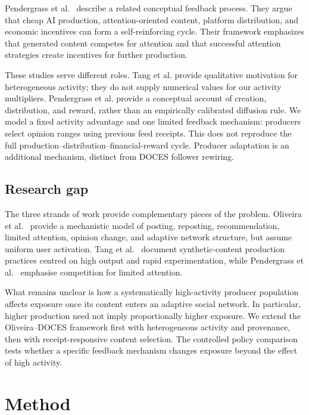 \documentclass[runningheads]{llncs}
\begin{document}
Pendergrass et al.~\cite{pendergrass2025} describe a related conceptual feedback process. They argue that cheap AI production, attention-oriented content, platform distribution, and economic incentives can form a self-reinforcing cycle. Their framework emphasizes that generated content competes for attention and that successful attention strategies create incentives for further production.

These studies serve different roles. Tang et al. provide qualitative motivation for heterogeneous activity; they do not supply numerical values for our activity multipliers. Pendergrass et al. provide a conceptual account of creation, distribution, and reward, rather than an empirically calibrated diffusion rule. We model a fixed activity advantage and one limited feedback mechanism: producers select opinion ranges using previous feed receipts. This does not reproduce the full production--distribution--financial-reward cycle. Producer adaptation is an additional mechanism, distinct from DOCES follower rewiring.

\subsection{Research gap}

The three strands of work provide complementary pieces of the problem. Oliveira et al.~\cite{oliveira2026} provide a mechanistic model of posting, reposting, recommendation, limited attention, opinion change, and adaptive network structure, but assume uniform user activation. Tang et al.~\cite{tang2026} document synthetic-content production practices centred on high output and rapid experimentation, while Pendergrass et al.~\cite{pendergrass2025} emphasise competition for limited attention.

What remains unclear is how a systematically high-activity producer population affects exposure once its content enters an adaptive social network. In particular, higher production need not imply proportionally higher exposure. We extend the Oliveira--DOCES framework first with heterogeneous activity and provenance, then with receipt-responsive content selection. The controlled policy comparison tests whether a specific feedback mechanism changes exposure beyond the effect of high activity.

\section{Method}
\end{document}
